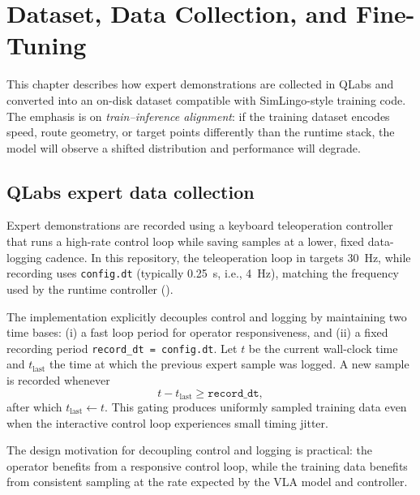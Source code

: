 \chapter{Dataset, Data Collection, and Fine-Tuning}
\label{ch:training}

This chapter describes how expert demonstrations are collected in QLabs and converted into an on-disk dataset compatible with SimLingo-style training code. The emphasis is on \emph{train--inference alignment}: if the training dataset encodes speed, route geometry, or target points differently than the runtime stack, the model will observe a shifted distribution and performance will degrade.

\section{QLabs expert data collection}
\label{sec:qlabs-expert-collection}
Expert demonstrations are recorded using a keyboard teleoperation controller that runs a high-rate control loop while saving samples at a lower, fixed data-logging cadence. In this repository, the teleoperation loop in  targets \SI{30}{Hz}, while recording uses \texttt{config.dt} (typically \SI{0.25}{s}, i.e., \SI{4}{Hz}), matching the frequency used by the runtime controller ().

The implementation explicitly decouples control and logging by maintaining two time bases: (i) a fast loop period for operator responsiveness, and (ii) a fixed recording period \texttt{record\_dt = config.dt}. Let $t$ be the current wall-clock time and $t_{\text{last}}$ the time at which the previous expert sample was logged. A new sample is recorded whenever
\begin{equation}
 t - t_{\text{last}} \ge \texttt{record\_dt},
\end{equation}
after which $t_{\text{last}}\leftarrow t$. This gating produces uniformly sampled training data even when the interactive control loop experiences small timing jitter.

The design motivation for decoupling control and logging is practical: the operator benefits from a responsive control loop, while the training data benefits from consistent sampling at the rate expected by the VLA model and controller.

